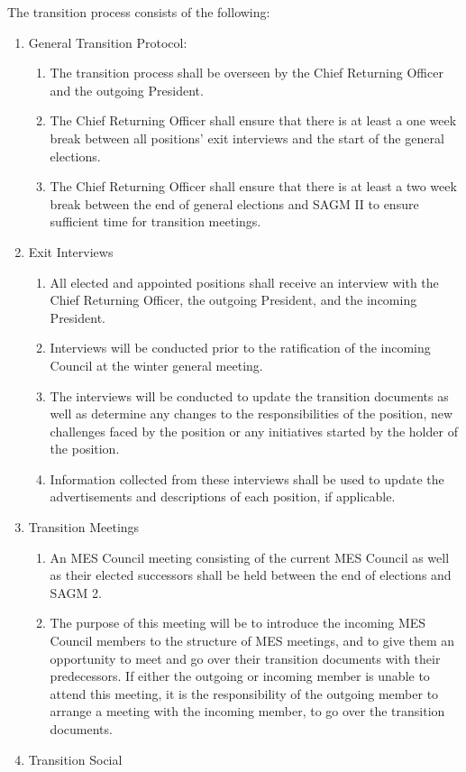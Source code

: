 The transition process consists of the following:

\begin{enumerate}
 \item
  General Transition Protocol:

  \begin{enumerate}
   \item
    The transition process shall be overseen by the Chief Returning Officer and the outgoing President.
   \item
    The Chief Returning Officer shall ensure that there is at least a one week break between all positions' exit interviews and the start of the general elections.
   \item
    The Chief Returning Officer shall ensure that there is at least a two week break between the end of general elections and SAGM II to ensure sufficient time for transition meetings.
  \end{enumerate}
 \item
  Exit Interviews

  \begin{enumerate}
   \item
    All elected and appointed positions shall receive an interview with the Chief Returning Officer, the outgoing President, and the incoming President.
   \item
    Interviews will be conducted prior to the ratification of the incoming Council at the winter general meeting.
   \item
    The interviews will be conducted to update the transition documents as well as determine any changes to the responsibilities of the position, new challenges faced by the position or any initiatives started by the holder of the position.
   \item
    Information collected from these interviews shall be used to update the advertisements and descriptions of each position, if applicable.
  \end{enumerate}
 \item
  Transition Meetings

  \begin{enumerate}
   \item
    An MES Council meeting consisting of the current MES Council as well as their elected successors shall be held between the end of elections and SAGM 2.
   \item
    The purpose of this meeting will be to introduce the incoming MES Council members to the structure of MES meetings, and to give them an opportunity to meet and go over their transition documents with their predecessors. If either the outgoing or incoming member is unable to attend this meeting, it is the responsibility of the outgoing member to arrange a meeting with the incoming member, to go over the transition documents.
  \end{enumerate}
 \item
  Transition Social


\end{enumerate}
